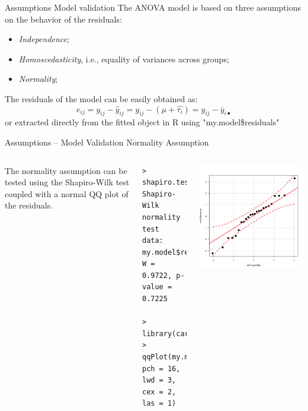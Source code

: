 %
%
\begin{frame}
{Assumptions}
{Model validation}
The ANOVA model is based on three assumptions on the behavior of the residuals:
\begin{itemize}
  \item \textit{Independence};
  \item \textit{Homoscedasticity}, i.e., equality of variances across groups;
  \item \textit{Normality};
\end{itemize}
The residuals of the model can be easily obtained as:
\begin{equation*}
e_{ij} = y_{ij} - \hat{y}_{ij} = y_{ij} - \left(\hat{\mu} + \hat{\tau_i}\right) = y_{ij}-\bar{y}_{i\bullet}
\end{equation*}
\noindent or extracted directly from the fitted object in R using "my.model\$residuals"

\end{frame}
%
%
\begin{frame}[fragile]
{Assumptions -- Model Validation}
{Normality Assumption}

\begin{columns}
    The normality assumption can be tested using the Shapiro-Wilk test coupled with a normal QQ plot of the residuals.
    {\smaller
\begin{verbatim}
> shapiro.test(model$residuals)
Shapiro-Wilk normality test
data:  my.model$residuals
W = 0.9722, p-value = 0.7225

> library(car)
> qqPlot(my.model$residuals,
pch = 16, lwd = 3, cex = 2, las = 1)
\end{verbatim}}

    \includegraphics[width=1\textwidth]{../img/paperqq.png}
  \end{columns}
\end{frame}
%

